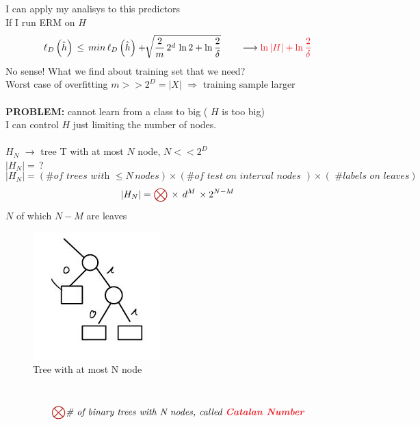 \documentclass[../main.tex]{subfiles}
\begin{document}
I can apply my analisys to this predictors
\\
If I run ERM on $H$ 
$$
\ell_D\left(\hat{h}\right) \, \leq \, min \, \ell_D \left(\hat{h}\right) + \sqrt[]{\frac{2}{m} \, 2^d  \, \ln 2 + \ln \frac{2}{\delta}} \qquad \longrightarrow \bred{$\ln|H|+\ln \frac{2}{\delta}$}
$$
No sense! What we find about training set that we need?
\\
Worst case of overfitting $m >> 2^D = |X|$ $\Rightarrow$ training sample larger
\\\\
\textbf{PROBLEM: }cannot learn from a class to big ( $H$ is too big)
\\
I can control $H$ just limiting the number of nodes.
\\\\
$H_N$ $\longrightarrow$  tree T with at most $N$ node, $N << 2^D$
\\
$|H_N| = \, ?$
\\
$$
|H_N| = \left( \textit{\# of trees with } \leq N \, nodes \right) 
\times
\left(  \textit{\# of test on interval nodes }  \right) 
\times
\left(  
\textit{ \# labels on leaves} 
\right) 
$$
$$
|H_N| = \red{\bigotimes} \, \times \, d^M \, \times 2^{N-M}
$$
$N$ of which $N-M$ are leaves
\begin{figure}[h]
    \centering
    \includegraphics[width=0.6\linewidth]{../img/lez9-img2.JPG}
    \caption{Tree with at most N node}
\end{figure}\\
$$\red{\bigotimes}
\textit{\# of binary trees with N  nodes, called \bred{Catalan Number}}
$$
\end{document}

